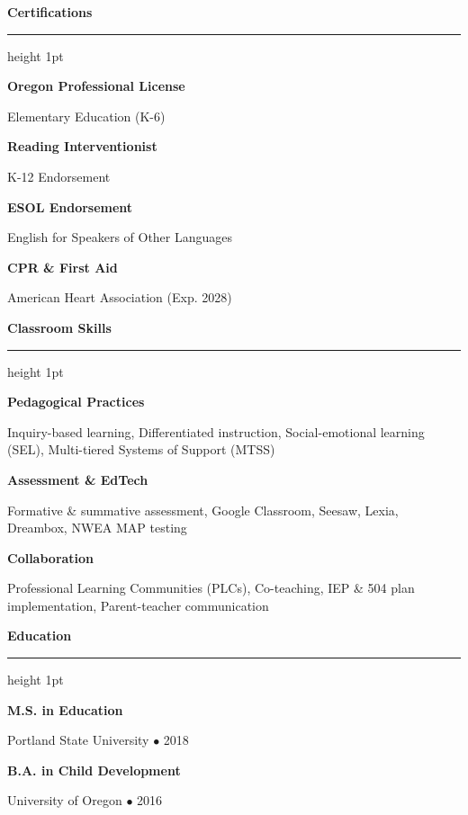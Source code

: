 \documentclass[10pt,letterpaper]{article}
\newcommand{\sectiontitle}[1]{%
  \vspace{0.25cm}%
  {\large\bfseries\color{accent} #1}%
  \par\vspace{-0.1cm}%
  {\color{linecolor}\hrule height 1pt}%
  \par\vspace{0.2cm}%
}
\newcommand{\certitem}[2]{%
  {\raggedright\textbf{\color{dark}#1}\par}%
  {\raggedright{\color{light}\small #2}\par}%
  \vspace{0.15cm}%
}
\newcommand{\skillcategory}[2]{%
  {\raggedright\textbf{\color{dark}#1}\par}%
  {\raggedright{\small\color{dark} #2}\par}%
  \vspace{0.18cm}%
}
\newcommand{\eduitem}[3]{%
  {\raggedright\textbf{\color{dark}#1}\par}%
  {\raggedright{\color{light}\small #2 $\bullet$ #3}\par}%
  \vspace{0.15cm}%
}
\begin{document}
\begin{minipage}[t]{0.30\linewidth}
  \sectiontitle{Certifications}
  \certitem{Oregon Professional License}{Elementary Education (K-6)}
  \certitem{Reading Interventionist}{K-12 Endorsement}
  \certitem{ESOL Endorsement}{English for Speakers of Other Languages}
  \certitem{CPR \& First Aid}{American Heart Association (Exp. 2028)}

  \sectiontitle{Classroom Skills}
  \skillcategory{Pedagogical Practices}{Inquiry-based learning, Differentiated instruction, Social-emotional learning (SEL), Multi-tiered Systems of Support (MTSS)}
  \skillcategory{Assessment \& EdTech}{Formative \& summative assessment, Google Classroom, Seesaw, Lexia, Dreambox, NWEA MAP testing}
  \skillcategory{Collaboration}{Professional Learning Communities (PLCs), Co-teaching, IEP \& 504 plan implementation, Parent-teacher communication}

  \sectiontitle{Education}
  \eduitem{M.S. in Education}{Portland State University}{2018}
  \eduitem{B.A. in Child Development}{University of Oregon}{2016}
\end{minipage}%
\hfill
\end{document}

